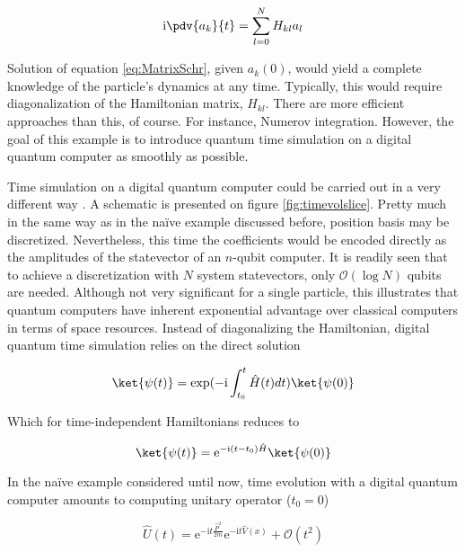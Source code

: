  \begin{equation}
    \mathrm{i}\pdv{a_k}{t} = \sum_{l = 0}^{N} H_{kl} a_l
    \label{eq:MatrixSchr}
  \end{equation}

  Solution of equation \ref{eq:MatrixSchr}, given $a_k(0)$, would yield a complete knowledge of the particle's dynamics at any time. Typically, this would require diagonalization of the Hamiltonian matrix, $H_{kl}$. There are more efficient approaches than this, of course. For instance, Numerov integration. However, the goal of this example is to introduce quantum time simulation on a digital quantum computer as smoothly as possible.

  Time simulation on a digital quantum computer could be carried out in a very different way \cite{Strini, Nielsen}. A schematic is presented on figure \ref{fig:timevolslice}. Pretty much in the same way as in the naïve example discussed before, position basis may be discretized. Nevertheless, this time the coefficients would be encoded directly as the amplitudes of the statevector of an $n$-qubit computer. It is readily seen that to achieve a discretization with $N$ system statevectors, only $\mathcal{O}(\log{N})$ qubits are needed. Although not very significant for a single particle, this illustrates that quantum computers have inherent exponential advantage over classical computers in terms of space resources. Instead of diagonalizing the Hamiltonian, digital quantum time simulation relies on the direct solution

  \begin{equation}
    \ket{\psi(t)} = \exp(-\mathrm{i}\int_{t_0}^t \hat{H}(t)dt)\ket{\psi(0)}
    \label{eq:UnitaryEvolution}
  \end{equation}

  Which for time-independent Hamiltonians reduces to

  \begin{equation}
    \ket{\psi(t)} = \mathrm{e}^{-\mathrm{i}(t - t_0) \hat{H}}\ket{\psi(0)}
    \label{eq:UnitaryEvolutionNoTime}
  \end{equation}

  In the naïve example considered until now, time evolution with a digital quantum computer amounts to computing unitary operator ($t_0 = 0$)

  \begin{equation}
    \hat{U}(t) = \mathrm{e}^{-\mathrm{i}t \frac{\hat{P}^2}{2m}}\mathrm{e}^{-\mathrm{i}t \hat{V}(x)} + \mathcal{O}(t^2)
  \end{equation}

